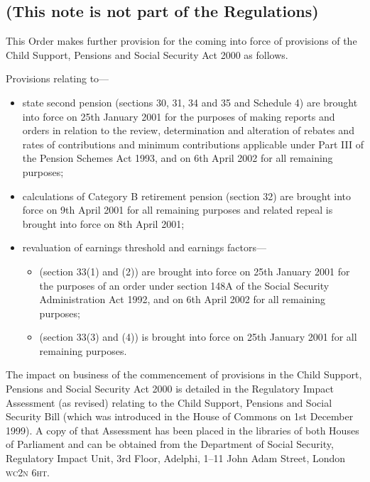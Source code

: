 \documentclass[12pt,a4paper]{article}
\begin{document}
\renewcommand\parthead{--- Explanatory Note}

\subsection*{(This note is not part of the Regulations)}

This Order makes further provision for the coming into force of provisions of the Child Support, Pensions and Social Security Act 2000 as follows.

Provisions relating to—
\begin{itemize}
\item    state second pension (sections 30, 31, 34 and 35 and Schedule 4) are brought into force on 25th January 2001 for the purposes of making reports and orders in relation to the review, determination and alteration of rebates and rates of contributions and minimum contributions applicable under Part III of the Pension Schemes Act 1993, and on 6th April 2002 for all remaining purposes;

\item    calculations of Category B retirement pension (section 32) are brought into force on 9th April 2001 for all remaining purposes and related repeal is brought into force on 8th April 2001;

\item    revaluation of earnings threshold and earnings factors—
\begin{itemize}
\item        (section 33(1) and (2)) are brought into force on 25th January 2001 for the purposes of an order under section 148A of the Social Security Administration Act 1992, and on 6th April 2002 for all remaining purposes;

\item        (section 33(3) and (4)) is brought into force on 25th January 2001 for all remaining purposes. 
\end{itemize}
\end{itemize}

The impact on business of the commencement of provisions in the Child Support, Pensions and Social Security Act 2000 is detailed in the Regulatory Impact Assessment (as revised) relating to the Child Support, Pensions and Social Security Bill (which was introduced in the House of Commons on 1st December 1999). A copy of that Assessment has been placed in the libraries of both Houses of Parliament and can be obtained from the Department of Social Security, Regulatory Impact Unit, 3rd Floor, Adelphi, 1--11 John Adam Street, London \textsc{\lowercase{WC2N 6HT}}. 
\end{document}
